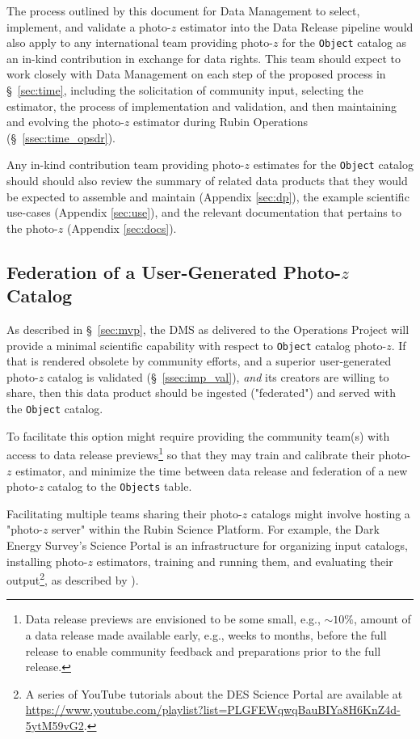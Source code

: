 \documentclass[DM,lsstdraft,toc]{lsstdoc}
\begin{document}
The process outlined by this document for Data Management to select, implement, and validate a photo-$z$ estimator into the Data Release pipeline would also apply to any international team providing photo-$z$ for the {\tt Object} catalog as an in-kind contribution in exchange for data rights. 
This team should expect to work closely with Data Management on each step of the proposed process in \S~\ref{sec:time}, including the solicitation of community input, selecting the estimator, the process of implementation and validation, and then maintaining and evolving the photo-$z$ estimator during Rubin Operations (\S~\ref{ssec:time_opsdr}).

Any in-kind contribution team providing photo-$z$ estimates for the {\tt Object} catalog should should also review the summary of related data products that they would be expected to assemble and maintain (Appendix \ref{sec:dp}), the example scientific use-cases (Appendix \ref{sec:use}), and the relevant documentation that pertains to the photo-$z$ (Appendix \ref{sec:docs}).

\subsection{Federation of a User-Generated Photo-$z$ Catalog}\label{ssec:opts_ugfed}

As described in \S~\ref{sec:mvp}, the DMS as delivered to the Operations Project will provide a minimal scientific capability with respect to {\tt Object} catalog photo-$z$.
If that is rendered obsolete by community efforts, and a superior user-generated photo-$z$ catalog is validated (\S~\ref{ssec:imp_val}), {\it and} its creators are willing to share, then this data product should be ingested ("federated") and served with the {\tt Object} catalog.

To facilitate this option might require providing the community team(s) with access to data release previews\footnote{Data release previews are envisioned to be some small, e.g., $\sim10\%$, amount of a data release made available early, e.g., weeks to months, before the full release to enable community feedback and preparations prior to the full release.} so that they may train and calibrate their photo-$z$ estimator, and minimize the time between data release and federation of a new photo-$z$ catalog to the {\tt Objects} table.

Facilitating multiple teams sharing their photo-$z$ catalogs might involve hosting a "photo-$z$ server" within the Rubin Science Platform.
For example, the Dark Energy Survey's Science Portal is an infrastructure for organizing input catalogs, installing photo-$z$ estimators, training and running them, and evaluating their output\footnote{A series of YouTube tutorials about the DES Science Portal are available at \url{https://www.youtube.com/playlist?list=PLGFEWqwqBauBIYa8H6KnZ4d-5ytM59vG2}.}, as described by \citet{2018A&C....25...58G}).
\end{document}
